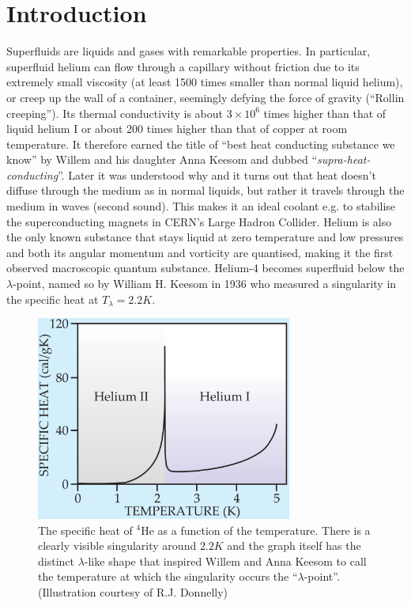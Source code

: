 \chapter{Introduction}
	Superfluids are liquids and gases with remarkable properties. In particular, superfluid helium can flow through a capillary without friction due to its extremely small viscosity (at least 1500 times smaller than normal liquid helium\citep{Kapitza1938}), or creep up the wall of a container, seemingly defying the force of gravity\citep{Rollin1939} (``Rollin creeping''). Its thermal conductivity is about $3\times10^6$ times higher than that of liquid helium I or about 200 times higher than that of copper at room temperature\citep{Keesom1936}. It therefore earned the title of ``best heat conducting substance we know'' by Willem and his daughter Anna Keesom and dubbed ``\emph{supra-heat-conducting}''\citep{Keesom1936}. Later it was understood why\citep{Tisza1938-1,Tisza1938-2,Tisza1940-1,Tisza1940-2} and it turns out that heat doesn't diffuse through the medium as in normal liquids, but rather it travels through the medium in waves (second sound). This makes it an ideal coolant e.g. to stabilise the superconducting magnets in CERN's Large Hadron Collider\citep{Lebrun1994}. Helium is also the only known substance that stays liquid at zero temperature and low pressures and both its angular momentum and vorticity are quantised, making it the first observed macroscopic quantum substance. Helium-4 becomes superfluid below the $\lambda$-point, named so by William H. Keesom in 1936 who measured a singularity in the specific heat at $T_\lambda=2.2\unit{K}$\citep{Keesom1936}.
	
	\begin{figure}[t]
		\begin{center}
			\includegraphics[width=0.75\textwidth]{specific-heat}
		\end{center}
		\caption{The specific heat of $^4$He as a function of the temperature. There is a clearly visible singularity around $2.2\unit{K}$ and the graph itself has the distinct $\lambda$-like shape that inspired\citep{Keesom1932} Willem and Anna Keesom to call the temperature at which the singularity occurs the ``$\lambda$-point''. (Illustration courtesy of R.J. Donnelly\citep{Donnelly2009})}
		\label{fig:specific-heat}
	\end{figure}	
	
